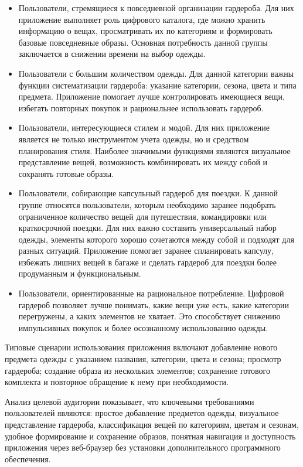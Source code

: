 \begin{itemize}
    \item {Пользователи, стремящиеся к повседневной организации гардероба.} 
    Для них приложение выполняет роль цифрового каталога, где можно хранить информацию о вещах, просматривать их по категориям и формировать базовые повседневные образы. Основная потребность данной группы заключается в снижении времени на выбор одежды.

    \item {Пользователи с большим количеством одежды.} 
    Для данной категории важны функции систематизации гардероба: указание категории, сезона, цвета и типа предмета. Приложение помогает лучше контролировать имеющиеся вещи, избегать повторных покупок и рациональнее использовать гардероб.

    \item {Пользователи, интересующиеся стилем и модой.} 
    Для них приложение является не только инструментом учета одежды, но и средством планирования стиля. Наиболее значимыми функциями являются визуальное представление вещей, возможность комбинировать их между собой и сохранять готовые образы.

    \item {Пользователи, собирающие капсульный гардероб для поездки.} 
    К данной группе относятся пользователи, которым необходимо заранее подобрать ограниченное количество вещей для путешествия, командировки или краткосрочной поездки. Для них важно составить универсальный набор одежды, элементы которого хорошо сочетаются между собой и подходят для разных ситуаций. Приложение помогает заранее спланировать капсулу, избежать лишних вещей в багаже и сделать гардероб для поездки более продуманным и функциональным.

    \item {Пользователи, ориентированные на рациональное потребление.} 
    Цифровой гардероб позволяет лучше понимать, какие вещи уже есть, какие категории перегружены, а каких элементов не хватает. Это способствует снижению импульсивных покупок и более осознанному использованию одежды.
\end{itemize}

Типовые сценарии использования приложения включают добавление нового предмета одежды с указанием названия, категории, цвета и сезона; просмотр гардероба; создание образа из нескольких элементов; сохранение готового комплекта и повторное обращение к нему при необходимости.

Анализ целевой аудитории показывает, что ключевыми требованиями пользователей являются: простое добавление предметов одежды, визуальное представление гардероба, классификация вещей по категориям, цветам и сезонам, удобное формирование и сохранение образов, понятная навигация и доступность приложения через веб-браузер без установки дополнительного программного обеспечения.

